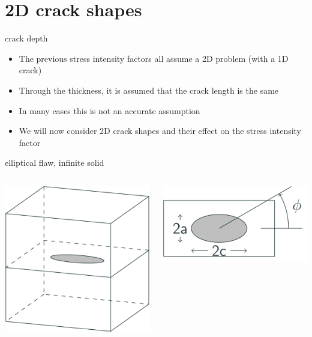 \documentclass[
  letterpaper,
  ignorenonframetext,
  aspectratio=43,
  handout,
  12pt]{beamer}
\providecommand{\tightlist}{%
  \setlength{\itemsep}{0pt}\setlength{\parskip}{0pt}}
\providecommand{\tightlist}{%
\setlength{\itemsep}{0pt}\setlength{\parskip}{0pt}}
\let\Oldincludegraphics\includegraphics
\renewcommand{\includegraphics}[2][]{\Oldincludegraphics[width=\textwidth,height=0.7\textheight,keepaspectratio]{#2}}
\begin{document}
\hypertarget{d-crack-shapes}{%
\section{2D crack shapes}\label{d-crack-shapes}}

\begin{frame}{crack depth}
\protect\hypertarget{crack-depth}{}
\begin{itemize}
\tightlist
\item
  The previous stress intensity factors all assume a 2D problem (with a
  1D crack)
\item
  Through the thickness, it is assumed that the crack length is the same
\item
  In many cases this is not an accurate assumption
\item
  We will now consider 2D crack shapes and their effect on the stress
  intensity factor
\end{itemize}
\end{frame}

\begin{frame}{elliptical flaw, infinite solid}
\protect\hypertarget{elliptical-flaw-infinite-solid}{}
\begin{columns}[T]
\begin{column}{0.5\textwidth}
\includegraphics{../images/internal flaw.svg}
\end{column}

\begin{column}{0.5\textwidth}
\includegraphics{../images/internal-flaw-in-plane.svg}
\end{column}
\end{columns}
\end{frame}
\end{document}
